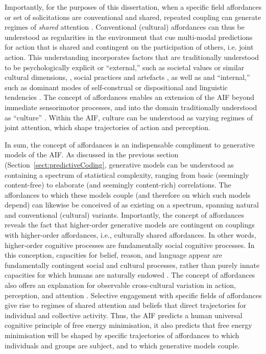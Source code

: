 \begin{CJK}{UTF8}{gbsn}
Importantly, for the purposes of this dissertation, when a specific field affordances or set of solicitations are conventional and shared, repeated coupling can generate regimes of \textit{shared} attention \citep{Ramstead2016}.  Conventional (cultural) affordances can thus be understood as regularities in the environment that cue multi-modal predictions for action that is shared and contingent on the participation of others, i.e. joint action.  This understanding incorporates factors that are traditionally understood to be psychologically explicit or ``external,'' such as societal values or similar cultural dimensions, \citep{Hofstede1991,Schwartz1992}, social practices and artefacts  \citep{Nisbett2003a}, as well as and ``internal,'' such as dominant modes of self-construal or dispositional and linguistic tendencies \citep{Markus1991}.  The concept of affordances enables an extension of the AIF beyond immediate sensorimotor processes, and into the domain traditionally understood as ``culture'' \citep{Roepstorff2010}.  Within the AIF, culture can be understood as varying regimes of joint attention, which shape trajectories of action and perception.

In sum, the concept of affordances is an indispensable compliment to generative models of the AIF.  As discussed in the previous section (Section~\ref{sect:predictiveCoding}, generative models can be understood as containing a spectrum of statistical complexity, ranging from basic (seemingly content-free) to elaborate (and seemingly content-rich) correlations.  The affordances to which these models couple (and therefore on which such models depend) can likewise be conceived of as existing on a spectrum, spanning natural and conventional (cultural) variants.  Importantly, the concept of affordances reveals the fact that higher-order generative models are contingent on couplings with higher-order affordances, i.e., culturally shared affordances.  In other words, higher-order cognitive processes are fundamentally social cognitive processes. In this conception, capacities for belief, reason, and language appear are fundamentally contingent social and cultural processes, rather than purely innate capacities for which humans are naturally endowed  \citep{Sperber1997,Henrich2015}.  The concept of affordances also offers an explanation for observable cross-cultural variation in action, perception, and attention \citep[see][]{Nisbett2003}.  Selective engagement with specific fields of affordances give rise to regimes of shared attention and beliefs that direct trajectories for individual and collective activity.  Thus, the AIF predicts a human universal cognitive principle of free energy minimisation, it also predicts that free energy minimisation will be shaped by specific trajectories of affordances to which individuals and groups are subject, and to which generative models couple.



\end{CJK}
